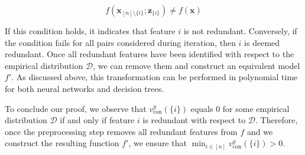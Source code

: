 \documentclass{article}
\newcommand{\z}{\textbf{z}}
\newcommand{\x}{\textbf{x}}
\begin{document}

\begin{equation}    
f(\x_{[n]\setminus \{i\}};\z_{\{i\}})\neq f(\x)
\end{equation}

If this condition holds, it indicates that feature $i$ is not redundant. Conversely, if the condition fails for all pairs considered during iteration, then $i$ is deemed redundant. Once all redundant features have been identified with respect to the empirical distribution $\mathcal{D}$, we can remove them and construct an equivalent model $f'$. As discussed above, this transformation can be performed in polynomial time for both neural networks and decision trees.



To conclude our proof, we observe that $v^g_{\text{con}}(\{i\})$ equals $0$ for some empirical distribution $\mathcal{D}$ if and only if feature $i$ is redundant with respect to $\mathcal{D}$. Therefore, once the preprocessing step removes all redundant features from $f$ and we construct the resulting function $f'$, we ensure that $\min_{i \in [n]} v^g_{\text{con}}(\{i\})>0$.
\end{document}
